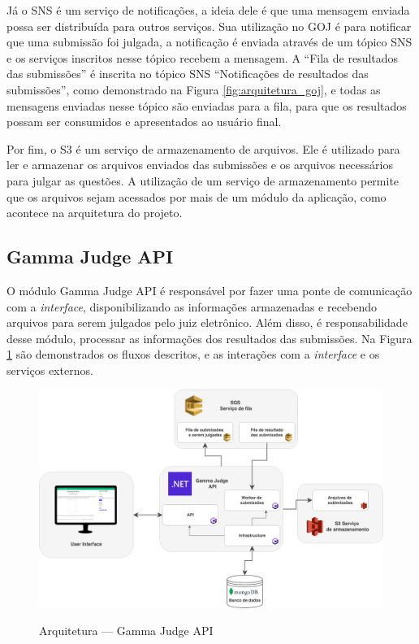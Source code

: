 Já o SNS é um serviço de notificações, a ideia dele é que uma mensagem enviada possa ser distribuída para outros serviços. Sua utilização no GOJ é para notificar que uma submissão foi julgada, a notificação é enviada através de um tópico SNS e os serviços inscritos nesse tópico recebem a mensagem. A ``Fila de resultados das submissões'' é inscrita no tópico SNS ``Notificações de resultados das submissões'', como demonstrado na Figura \ref{fig:arquitetura_goj}, e todas as mensagens enviadas nesse tópico são enviadas para a fila, para que os resultados possam ser consumidos e apresentados ao usuário final.

Por fim, o S3 é um serviço de armazenamento de arquivos. Ele é utilizado para ler e armazenar os arquivos enviados das submissões e os arquivos necessários para julgar as questões. A utilização de um serviço de armazenamento permite que os arquivos sejam acessados por mais de um módulo da aplicação, como acontece na arquitetura do projeto.

\subsection{Gamma Judge API} 
\label{subsec:arquitetura_judge_api}

O módulo Gamma Judge API é responsável por fazer uma ponte de comunicação com a \textit{interface}, disponibilizando as informações armazenadas e recebendo arquivos para serem julgados pelo juiz eletrônico. Além disso, é responsabilidade desse módulo, processar as informações dos resultados das submissões. Na Figura \ref{fig:arquitetura_goj_api} são demonstrados os fluxos descritos, e as interações com a \textit{interface} e os serviços externos.

\begin{figure}[H]
    \centering
    \caption{Arquitetura — Gamma Judge API}
    \includegraphics[keepaspectratio=true,scale=0.35]{figuras/arquitetura_goj_api.png}
    \label{fig:arquitetura_goj_api}
\end{figure}

